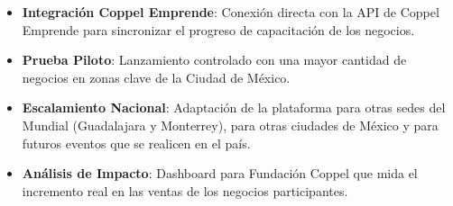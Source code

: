 \documentclass[11pt,a4paper]{article}
\begin{document}
\begin{itemize}[leftmargin=*, itemsep=2pt]
  \item \textbf{Integración Coppel Emprende}: Conexión directa con la API de Coppel
        Emprende para sincronizar el progreso de capacitación de los negocios.
  \item \textbf{Prueba Piloto}: Lanzamiento controlado con una mayor cantidad de negocios en
        zonas clave de la Ciudad de México.
  \item \textbf{Escalamiento Nacional}: Adaptación de la plataforma para otras sedes
        del Mundial (Guadalajara y Monterrey), para otras ciudades de México y  para futuros eventos que se realicen en el país.
  \item \textbf{Análisis de Impacto}: Dashboard para Fundación Coppel que mida
        el incremento real en las ventas de los negocios participantes.
\end{itemize}

\end{document}
